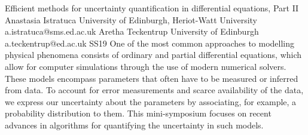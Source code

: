 \documentclass[12pt,a4paper,figuresright]{book}
\begin{document}




\clearpage

\begin{session}
 {Efficient methods for uncertainty quantification in differential equations, Part II}%
 {Anastasia Istratuca}%
 {University of Edinburgh, Heriot-Watt University}%
 {a.istratuca@sms.ed.ac.uk}%
 {Aretha Teckentrup}%
 {University of Edinburgh}%
 {a.teckentrup@ed.ac.uk}%
 {SS19}%
 {}%
 One of the most common approaches to modelling physical phenomena consists of ordinary and partial differential equations, which allow for computer simulations through the use of modern numerical solvers. These models encompass parameters that often have to be measured or inferred from data. To account for error measurements and scarce availability of the data, we express our uncertainty about the parameters by associating, for example, a probability distribution to them. This mini-symposium focuses on recent advances in algorithms for quantifying the uncertainty in such models.
\end{session}

%



\clearpage
\end{document}
